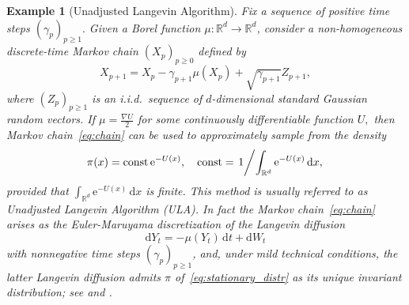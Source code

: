 \documentclass[bj]{imsart}
\def\rmd{\mathrm{d}}
\def\rme{\mathrm{e}}
\newtheorem{example}{Example}
\begin{document}
\begin{example}[Unadjusted Langevin Algorithm]
\label{exam:langevin-algorithm}
Fix a sequence of positive time steps \((\gamma_p)_{p\geq 1}.\) Given a Borel function $\mu\colon\mathbb{R}^{d}\to\mathbb{R}^{d}$,
consider a non-homogeneous
discrete-time Markov chain $(X_{p})_{p\geq0}$ defined by
\begin{equation}\label{eq:chain}
X_{p+1}=X_{p}-\gamma_{p+1}\mu(X_{p})+\sqrt{\gamma_{p+1}}Z_{p+1},\end{equation}
where $\left(Z_{p}\right)_{p\geq1}$ is an i.i.d.\ sequence of $d$-dimensional
standard Gaussian random vectors. If
${\mu=\frac{\nabla U}{2}}$
for some continuously differentiable function $U,$ then Markov chain~\eqref{eq:chain} can be used to approximately sample from the density
\begin{equation}\label{eq:stationary_distr}
\pi(x)= \mathrm{const}\,\rme^{-U(x)}, \quad \mathrm{const}= \left. 1 \middle /{\int_{\mathbb{R}^{d}} \rme^{-U(x)}\, \rmd x,} \right.
\end{equation}
provided that \(\int_{\mathbb{R}^{d}} \rme^{-U(x)}\,\rmd x\) is finite. This method is usually referred to as
Unadjusted Langevin Algorithm (ULA).
In fact the Markov chain~\eqref{eq:chain}
arises as the Euler-Maruyama discretization
of the Langevin diffusion
\[
\rmd Y_t=-\mu(Y_t)\,\rmd t+ \rmd W_t
\]
with nonnegative time steps $(\gamma_p)_{p\ge1}$,
and,  under mild technical conditions, the latter Langevin diffusion admits $\pi$
of~\eqref{eq:stationary_distr}
as its unique invariant distribution; see \cite{dalalyan2017theoretical} and \cite{durmus:moulines:2017}.
\end{example}
\end{document}
